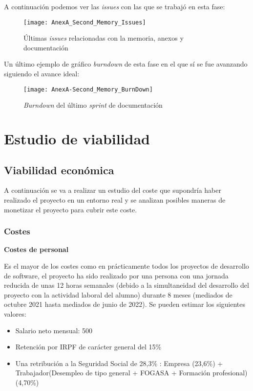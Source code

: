 A continuación podemos ver las \textit{issues} con las que se trabajó en esta fase:

\begin{figure}[!h]
	\centering
	\texttt{[image: AnexA\_Second\_Memory\_Issues]}
	\caption{Últimas \textit{issues} relacionadas con la memoria, anexos y documentación}
	\label{fig:AnexA_Second_Memory_Issues}
\end{figure}
\FloatBarrier

Un último ejemplo de gráfico \textit{burndown} de esta fase en el que sí se fue avanzando siguiendo el avance ideal:

\begin{figure}[!h]
	\centering
	\texttt{[image: AnexA-Second\_Memory\_BurnDown]}
	\caption{\textit{Burndown} del último \textit{sprint} de documentación}
	\label{fig:AnexA-Second_Memory_BurnDown}
\end{figure}
\FloatBarrier


\section{Estudio de viabilidad}
\subsection{Viabilidad económica}
A continuación se va a realizar un estudio del coste que supondría haber realizado el proyecto en un entorno real y se analizan posibles maneras de monetizar el proyecto para cubrir este coste.

\subsubsection{Costes}
\textbf{Costes de personal}

Es el mayor de los costes como en prácticamente todos los proyectos de desarrollo de software, el proyecto ha sido realizado por una persona con una jornada reducida de unas 12 horas semanales (debido a la simultaneidad del desarrollo del proyecto con la actividad laboral del alumno) durante 8 meses (mediados de octubre 2021 hasta mediados de junio de 2022). Se pueden estimar los siguientes valores:
\begin{itemize}
	\tightlist
	\item Salario neto mensual: 500 \officialeuro
	\item Retención por IRPF de carácter general del 15\% \cite{agencia_tributaria_cuadro_2022}
	\item Una retribución a la Seguridad Social de 28,3\% \cite{ministerio_de_empleo_y_seguridad_social_bases_2022}: Empresa (23,6\%) +  Trabajador(Desempleo de tipo general + FOGASA + Formación profesional)(4,70\%)
\end{itemize}


